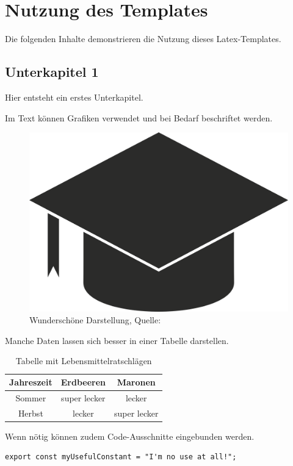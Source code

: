 \chapter{Nutzung des Templates}\label{kap_muster}

Die folgenden Inhalte demonstrieren die Nutzung dieses Latex-Templates.

\section{Unterkapitel 1}\label{kap_unterkapitel1}

Hier entsteht ein erstes Unterkapitel.

Im Text können Grafiken verwendet und bei Bedarf beschriftet werden.

\begin{figure}[h!]
\centering
\includegraphics[width=.6\linewidth]{decorative/University_Logo.png}
\caption{Wunderschöne Darstellung, Quelle: \cite{THKoeln2024}}
\label{fig_my-beautiful-image}
\end{figure}

Manche Daten lassen sich besser in einer Tabelle darstellen.

\begin{table}[h!]
\centering
\begin{tabular}{|c c c|} 
\hline
Jahreszeit & Erdbeeren & Maronen \\
\hline
Sommer & super lecker & lecker \\ 
Herbst & lecker & super lecker \\
\hline
\end{tabular}
\caption{Tabelle mit Lebensmittelratschlägen}
\label{tab_food}
\end{table}

Wenn nötig können zudem Code-Ausschnitte eingebunden werden.

\begin{lstlisting}[breaklines, captionpos=b, caption={Mein wunderschöner Code}, label={lst_listing1}]
export const myUsefulConstant = "I'm no use at all!";
\end{lstlisting}

